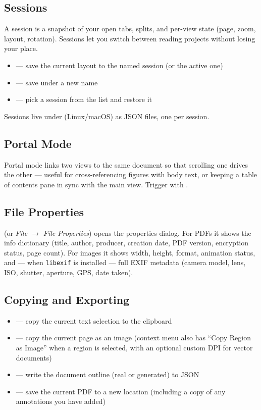 \documentclass[a4paper,12pt]{article}
\newcommand{\pathtt}[1]{{\ttfamily\seqsplit{#1}}}
\begin{document}
\subsection{Sessions}

A session is a snapshot of your open tabs, splits, and per-view state (page, zoom, layout, rotation). Sessions let you switch between reading projects without losing your place.

\begin{itemize}[leftmargin=*]
    \item {} — save the current layout to the named session (or the active one)
    \item {} — save under a new name
    \item {} — pick a session from the list and restore it
\end{itemize}

Sessions live under \pathtt{\$HOME/.local/share/lektra/sessions/} (Linux/macOS) as JSON files, one per session.

\subsection{Portal Mode}

Portal mode links two views to the same document so that scrolling one drives the other — useful for cross-referencing figures with body text, or keeping a table of contents pane in sync with the main view. Trigger with .

\subsection{File Properties}

 (or \textit{File $\to$ File Properties}) opens the properties dialog. For PDFs it shows the info dictionary (title, author, producer, creation date, PDF version, encryption status, page count). For images it shows width, height, format, animation status, and — when \texttt{libexif} is installed — full EXIF metadata (camera model, lens, ISO, shutter, aperture, GPS, date taken).

\subsection{Copying and Exporting}

\begin{itemize}[leftmargin=*]
    \item {} — copy the current text selection to the clipboard
    \item {} — copy the current page as an image (context menu also has ``Copy Region as Image'' when a region is selected, with an optional custom DPI for vector documents)
    \item {} — write the document outline (real or generated) to JSON
    \item {} — save the current PDF to a new location (including a copy of any annotations you have added)
\end{itemize}
\end{document}
